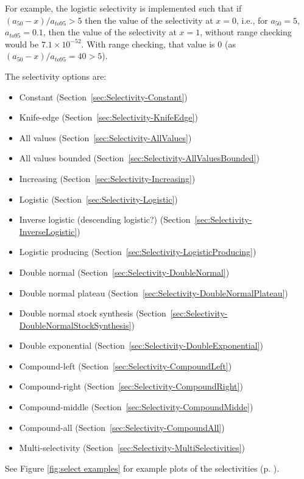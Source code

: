 For example, the logistic selectivity is implemented such that if $(a_{50}-x)/a_{to95} > 5$ then the value of the selectivity at $x=0$, i.e., for $a_{50}=5$, $a_{to95}=0.1$, then the value of the selectivity at $x=1$, without range checking would be $7.1 \times 10^{-52}$. With range checking, that value is $0$ (as $(a_{50}-x)/a_{to95}=40 > 5$).

The selectivity options are:

\begin{itemize}
  \item Constant (Section~\ref{sec:Selectivity-Constant})
  \item Knife-edge (Section~\ref{sec:Selectivity-KnifeEdge})
  \item All values (Section~\ref{sec:Selectivity-AllValues})
  \item All values bounded (Section~\ref{sec:Selectivity-AllValuesBounded})
  \item Increasing (Section~\ref{sec:Selectivity-Increasing})
  \item Logistic (Section~\ref{sec:Selectivity-Logistic})
  \item Inverse logistic (descending logistic?) (Section~\ref{sec:Selectivity-InverseLogistic})
  \item Logistic producing (Section~\ref{sec:Selectivity-LogisticProducing})
  \item Double normal (Section~\ref{sec:Selectivity-DoubleNormal})
  \item Double normal plateau (Section~\ref{sec:Selectivity-DoubleNormalPlateau})
  \item Double normal stock synthesis (Section~\ref{sec:Selectivity-DoubleNormalStockSynthesis})
  \item Double exponential (Section~\ref{sec:Selectivity-DoubleExponential})
  \item Compound-left (Section~\ref{sec:Selectivity-CompoundLeft})
  \item Compound-right (Section~\ref{sec:Selectivity-CompoundRight})
  \item Compound-middle (Section~\ref{sec:Selectivity-CompoundMidde})
  \item Compound-all (Section~\ref{sec:Selectivity-CompoundAll})
  \item Multi-selectivity  (Section~\ref{sec:Selectivity-MultiSelectivities})
\end{itemize}

See Figure \ref{fig:select examples} for example plots of the selectivities (p. \pageref{fig:select examples}).

